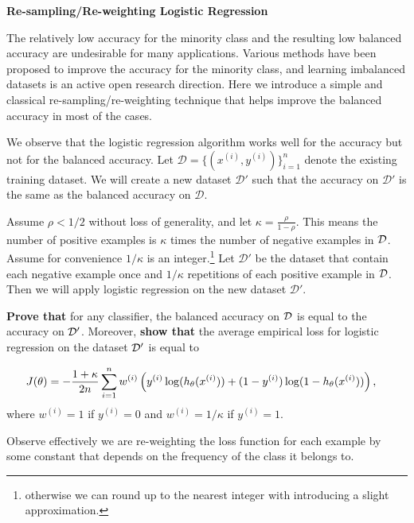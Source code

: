 \item {} \textbf{Re-sampling/Re-weighting Logistic Regression}

The relatively low accuracy for the minority class and the resulting low balanced accuracy are undesirable for many applications. Various methods have been proposed to improve the accuracy for the minority class, and learning imbalanced datasets is  an active open research direction. Here we introduce a simple and classical re-sampling/re-weighting technique that helps improve the balanced accuracy in most of the cases. 

We observe that the logistic regression algorithm works well for the accuracy but not for the balanced accuracy. Let $\mathcal{D} = \{(x^{(i)}, y^{(i)})\}_{i=1}^n$ denote the existing training dataset. We will create a new dataset $\mathcal{D}'$ such that the accuracy on $\mathcal{D}'$ is the same as the balanced accuracy on $\mathcal{D}$.

Assume $\rho < 1/2$ without loss of generality, and let $\kappa = \frac{\rho}{1-\rho}$. This means the number of positive examples is $\kappa$ times the number of negative examples in $\mathcal{D}$. Assume for convenience $1/\kappa$ is an integer.\footnote{otherwise we can round up to the nearest integer with introducing a slight approximation.} Let $\mathcal{D}'$ be the dataset that contain each negative example once and $1/\kappa$ repetitions of each positive example in $\mathcal{D}$. Then we will apply logistic regression on the new dataset $\mathcal{D}'$.  

{\bf Prove that} for any classifier, the balanced accuracy on $\mathcal{D}$ is equal to the accuracy on $\mathcal{D}'$. Moreover, {\bf show that} the average empirical loss for logistic regression on the dataset $\mathcal{D}'$ is equal to 


\begin{align*}
J(\theta) &= -\frac{1+\kappa}{2n} \sum_{i=1}^{n} w^{(i)} \left(y^{(i)}\log(h_{\theta}(x^{(i)}))
+  (1 - y^{(i)})\log(1 - h_{\theta}(x^{(i)}))\right),
\end{align*}
where $w^{(i)} = 1$ if $y^{(i)} =0$ and $w^{(i)} = 1/\kappa$ if $y^{(i)} = 1$.


Observe effectively we are re-weighting the loss function for each example by some constant that depends on the frequency of the class it belongs to.


